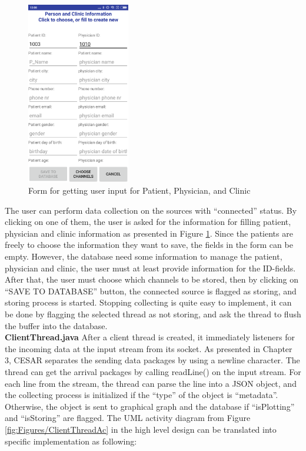 \begin{figure}
    \centering
    \includegraphics[width=0.4\textwidth]{Figures/clinicpatient.png}
    \caption{Form for getting user input for Patient, Physician, and Clinic}
    \label{fig:Figures/clinicpatient}
\end{figure}
The user can perform data collection on the sources with “connected” status. By clicking on one of them, the user is asked for the information for filling patient, physician and clinic information as presented in Figure \ref{fig:Figures/clinicpatient}. Since the patients are freely to choose the information they want to save, the fields in the form can be empty. However, the database need some information to manage the patient, physician and clinic, the user must at least provide information for the ID-fields. After that, the user must choose which channels to be stored, then by clicking on “SAVE TO DATABASE” button, the connected source is flagged as storing, and storing process is started. Stopping collecting is quite easy to implement, it can be done by flagging the selected thread as not storing, and ask the thread to flush the buffer into the database.\\
\textbf{ClientThread.java}
After a client thread is created, it immediately listeners for the incoming data at the input stream from its socket. As presented in Chapter 3, CESAR separates the sending data packages by using a newline character. The thread can get the arrival packages by calling readLine() on the input stream. For each line from the stream, the thread can parse the line into a JSON object, and the collecting process is initialized if the “type” of the object is “metadata”. Otherwise, the object is sent to graphical graph and the database if “isPlotting” and “isStoring” are flagged. The UML activity diagram from Figure \ref{fig:Figures/ClientThreadAc} in the high level design can be translated into specific implementation as following:
